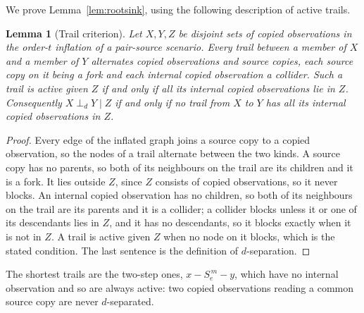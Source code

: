 \documentclass[11pt]{article}
\theoremstyle{plain}
\newtheorem{lemma}[theorem]{Lemma}
\theoremstyle{definition}
\begin{document}
We prove Lemma~\ref{lem:rootsink}, using the following description of active trails.

\begin{lemma}[Trail criterion]\label{lem:trail}
Let $X,Y,Z$ be disjoint sets of copied observations in the order-$t$ inflation of a pair-source scenario. Every trail between a member of $X$ and a member of $Y$ alternates copied observations and source copies, each source copy on it being a fork and each internal copied observation a collider. Such a trail is active given $Z$ if and only if all its internal copied observations lie in $Z$. Consequently $X\perp_dY\mid Z$ if and only if no trail from $X$ to $Y$ has all its internal copied observations in $Z$.
\end{lemma}

\begin{proof}
Every edge of the inflated graph joins a source copy to a copied observation, so the nodes of a trail alternate between the two kinds. A source copy has no parents, so both of its neighbours on the trail are its children and it is a fork. It lies outside $Z$, since $Z$ consists of copied observations, so it never blocks. An internal copied observation has no children, so both of its neighbours on the trail are its parents and it is a collider; a collider blocks unless it or one of its descendants lies in $Z$, and it has no descendants, so it blocks exactly when it is not in $Z$. A trail is active given $Z$ when no node on it blocks, which is the stated condition. The last sentence is the definition of $d$-separation.
\end{proof}

The shortest trails are the two-step ones, $x-S_e^{\,m}-y$, which have no internal observation and so are always active: two copied observations reading a common source copy are never $d$-separated.
\end{document}
